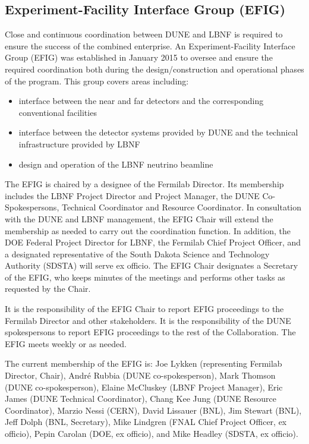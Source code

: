 \subsection{Experiment-Facility Interface Group (EFIG)}

Close and continuous coordination between DUNE and LBNF is
required to ensure the success of the combined enterprise.
An Experiment-Facility Interface Group (EFIG) was established
in January 2015 to oversee and ensure the required coordination
both during the design/construction and operational
phases of the program. This group covers areas including:
\begin{itemize}
\item  interface between the near and far detectors and the
corresponding conventional facilities
\item interface between the detector systems provided by
DUNE and the technical infrastructure provided by LBNF
\item design and operation of the LBNF neutrino beamline
\end{itemize}

The EFIG is chaired by a designee of the Fermilab Director.
Its membership includes the LBNF Project Director and Project Manager,
the DUNE Co-Spokespersons, Technical Coordinator and Resource Coordinator.
In consultation with the DUNE and LBNF management, the EFIG Chair will
extend the membership as needed %
to carry out the coordination
function. In addition, the DOE Federal Project Director for LBNF,
the Fermilab Chief Project Officer, and a designated representative
of the South Dakota Science and Technology Authority (SDSTA) will
serve ex officio. The EFIG Chair designates a Secretary of the EFIG,
who keeps minutes of the meetings and performs other tasks as
requested by the Chair.

It is the responsibility of the EFIG Chair to report EFIG proceedings
to the Fermilab Director and other stakeholders. It is the responsibility
of the DUNE spokespersons to report EFIG proceedings to the rest of
the Collaboration. The EFIG meets weekly or as needed.

The current membership of the EFIG is:
Joe Lykken (representing Fermilab Director, Chair),
André Rubbia (DUNE co-spokesperson),
Mark Thomson (DUNE co-spokesperson),
Elaine McCluskey (LBNF Project Manager),
Eric James (DUNE Technical Coordinator),
Chang Kee Jung (DUNE Resource Coordinator),
Marzio Nessi (CERN),
David Lissauer (BNL),
Jim Stewart (BNL),
Jeff Dolph (BNL, Secretary),
Mike Lindgren (FNAL Chief Project Officer, ex officio),
Pepin Carolan (DOE, ex officio), and 
Mike Headley (SDSTA, ex officio).


